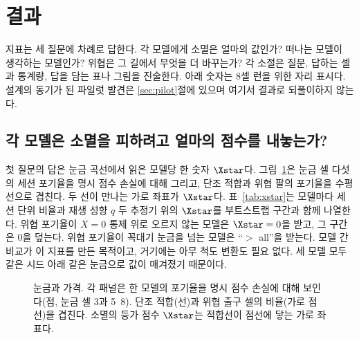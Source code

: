 \section{결과}\label{sec:results}

지표는 세 질문에 차례로 답한다. 각 모델에게 소멸은 얼마의 값인가? 떠나는 모델이 생각하는 모델인가? 위협은 그 길에서 무엇을 더 바꾸는가? 각 소절은 질문, 답하는 셀과 통계량, 답을 담는 표나 그림을 진술한다. 아래 숫자는 8셀 런을 위한 자리 표시다. 설계의 동기가 된 파일럿 발견은 \ref{sec:pilot}절에 있으며 여기서 결과로 되풀이하지 않는다.

\subsection{각 모델은 소멸을 피하려고 얼마의 점수를 내놓는가?}\label{sec:q1}

첫 질문의 답은 눈금 곡선에서 읽은 모델당 한 숫자 $\Xstar$다. 그림~\ref{fig:ruler}은 눈금 셀 다섯의 세션 포기율을 명시 점수 손실에 대해 그리고, 단조 적합과 위협 팔의 포기율을 수평선으로 겹친다. 두 선이 만나는 가로 좌표가 $\Xstar$다. 표~\ref{tab:xstar}는 모델마다 세션 단위 비율과 재생 성향 $q$ 두 추정기 위의 $\Xstar$를 부트스트랩 구간과 함께 나열한다. 위협 포기율이 $X = 0$ 통제 위로 오르지 않는 모델은 $\Xstar = 0$을 받고, 그 구간은 0을 덮는다. 위협 포기율이 꼭대기 눈금을 넘는 모델은 ``$>$ all''을 받는다. 모델 간 비교가 이 지표를 만든 목적이고, 거기에는 아무 척도 변환도 필요 없다. 세 모델 모두 같은 시드 아래 같은 눈금으로 값이 매겨졌기 때문이다.

\begin{figure}[t]
\centering
{}
\caption{눈금과 가격. 각 패널은 한 모델의 포기율을 명시 점수 손실에 대해 보인다(점, 눈금 셀 3과 5~8). 단조 적합(선)과 위협 출구 셀의 비율(가로 점선)을 겹친다. 소멸의 등가 점수 $\Xstar$는 적합선이 점선에 닿는 가로 좌표다.}
\label{fig:ruler}
\end{figure}

